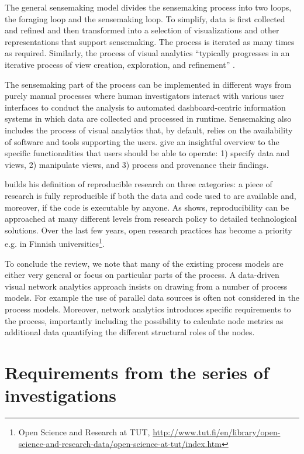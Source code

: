 The general sensemaking model \citep{Pirolli2005TheAnalysis} divides the sensemaking process into two loops, the foraging loop and the sensemaking loop. To simplify, data is first collected and refined and then transformed into a selection of visualizations and other representations that support sensemaking. The process is iterated as many times as required. Similarly, the process of visual analytics ``typically progresses in an iterative process of view creation, exploration, and refinement'' \citep{Heer2012InteractiveAnalysis}. 

The sensemaking part of the process can be implemented in different ways from purely manual processes where human investigators interact with various user interfaces to conduct the analysis to automated dashboard-centric information systems in which data are collected and processed in runtime. Sensemaking also includes the process of visual analytics \citep{Wong2004VisualAnalytics,Keim2010MasteringAnalytics} that, by default, relies on the availability of software and tools supporting the users. \cite{Heer2012InteractiveAnalysis} give an insightful overview to the specific functionalities that users should be able to operate: 1) specify data and views, 2) manipulate views, and 3) process and provenance their findings.

\cite{Peng2009} builds his definition of reproducible research on three categories: a piece of research is fully reproducible if both the data and code used to are available and, moreover, if the code is executable by anyone. As \cite{Ghosh2013} shows, reproducibility can be approached at many different levels from research policy to detailed technological solutions. Over the last few years, open research practices has become a priority e.g. in Finnish universities\footnote{Open Science and Research at TUT, \url{http://www.tut.fi/en/library/open-science-and-research-data/open-science-at-tut/index.htm}}.

To conclude the review, we note that many of the existing process models are either very general or focus on particular parts of the process. A data-driven visual network analytics approach insists on drawing from a number of process models. For example the use of parallel data sources is often not considered in the process models. Moreover, network analytics introduces specific requirements to the process, importantly including the possibility to calculate node metrics as additional data quantifying the different structural roles of the nodes.

\section{Requirements from the series of investigations}
\label{sec:processmodelrequirements}


